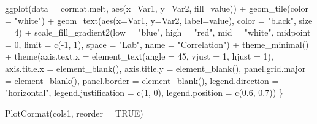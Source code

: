\documentclass[
]{article}
\newenvironment{Shaded}{\begin{snugshade}}{\end{snugshade}}
\newcommand{\AttributeTok}[1]{\textcolor[rgb]{0.77,0.63,0.00}{#1}}
\newcommand{\ConstantTok}[1]{\textcolor[rgb]{0.00,0.00,0.00}{#1}}
\newcommand{\DecValTok}[1]{\textcolor[rgb]{0.00,0.00,0.81}{#1}}
\newcommand{\FloatTok}[1]{\textcolor[rgb]{0.00,0.00,0.81}{#1}}
\newcommand{\FunctionTok}[1]{\textcolor[rgb]{0.00,0.00,0.00}{#1}}
\newcommand{\NormalTok}[1]{#1}
\newcommand{\SpecialCharTok}[1]{\textcolor[rgb]{0.00,0.00,0.00}{#1}}
\newcommand{\StringTok}[1]{\textcolor[rgb]{0.31,0.60,0.02}{#1}}
\begin{document}
\begin{Shaded}
\begin{Highlighting}[]
  \FunctionTok{ggplot}\NormalTok{(}\AttributeTok{data =}\NormalTok{ cormat.melt, }\FunctionTok{aes}\NormalTok{(}\AttributeTok{x=}\NormalTok{Var1, }\AttributeTok{y=}\NormalTok{Var2, }\AttributeTok{fill=}\NormalTok{value)) }\SpecialCharTok{+} 
    \FunctionTok{geom\_tile}\NormalTok{(}\AttributeTok{color =} \StringTok{"white"}\NormalTok{) }\SpecialCharTok{+}
    \FunctionTok{geom\_text}\NormalTok{(}\FunctionTok{aes}\NormalTok{(}\AttributeTok{x=}\NormalTok{Var1, }\AttributeTok{y=}\NormalTok{Var2, }\AttributeTok{label=}\NormalTok{value), }\AttributeTok{color =} \StringTok{"black"}\NormalTok{, }\AttributeTok{size =} \DecValTok{4}\NormalTok{) }\SpecialCharTok{+}
    \FunctionTok{scale\_fill\_gradient2}\NormalTok{(}\AttributeTok{low =} \StringTok{"blue"}\NormalTok{, }\AttributeTok{high =} \StringTok{"red"}\NormalTok{, }\AttributeTok{mid =} \StringTok{"white"}\NormalTok{, }\AttributeTok{midpoint =} \DecValTok{0}\NormalTok{,}
                         \AttributeTok{limit =} \FunctionTok{c}\NormalTok{(}\SpecialCharTok{{-}}\DecValTok{1}\NormalTok{, }\DecValTok{1}\NormalTok{), }\AttributeTok{space =} \StringTok{"Lab"}\NormalTok{, }\AttributeTok{name =} \StringTok{"Correlation"}\NormalTok{) }\SpecialCharTok{+}
    \FunctionTok{theme\_minimal}\NormalTok{() }\SpecialCharTok{+}
    \FunctionTok{theme}\NormalTok{(}\AttributeTok{axis.text.x =} \FunctionTok{element\_text}\NormalTok{(}\AttributeTok{angle =} \DecValTok{45}\NormalTok{, }\AttributeTok{vjust =} \DecValTok{1}\NormalTok{, }\AttributeTok{hjust =} \DecValTok{1}\NormalTok{),}
          \AttributeTok{axis.title.x =} \FunctionTok{element\_blank}\NormalTok{(),}
          \AttributeTok{axis.title.y =} \FunctionTok{element\_blank}\NormalTok{(),}
          \AttributeTok{panel.grid.major =} \FunctionTok{element\_blank}\NormalTok{(),}
          \AttributeTok{panel.border =} \FunctionTok{element\_blank}\NormalTok{(),}
          \AttributeTok{legend.direction =} \StringTok{"horizontal"}\NormalTok{,}
          \AttributeTok{legend.justification =} \FunctionTok{c}\NormalTok{(}\DecValTok{1}\NormalTok{, }\DecValTok{0}\NormalTok{),}
          \AttributeTok{legend.position =} \FunctionTok{c}\NormalTok{(}\FloatTok{0.6}\NormalTok{, }\FloatTok{0.7}\NormalTok{))}
\NormalTok{\}}
\end{Highlighting}
\end{Shaded}

\begin{Shaded}
\begin{Highlighting}[]
\FunctionTok{PlotCormat}\NormalTok{(cols1, }\AttributeTok{reorder =} \ConstantTok{TRUE}\NormalTok{)}
\end{Highlighting}
\end{Shaded}
\end{document}
